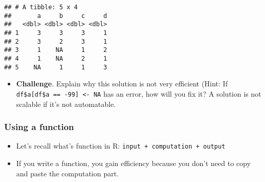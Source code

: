 \documentclass[
]{book}
\newenvironment{Shaded}{\begin{snugshade}}{\end{snugshade}}
\newcommand{\CommentTok}[1]{\textcolor[rgb]{0.56,0.35,0.01}{\textit{#1}}}
\newcommand{\ConstantTok}[1]{\textcolor[rgb]{0.00,0.00,0.00}{#1}}
\newcommand{\DecValTok}[1]{\textcolor[rgb]{0.00,0.00,0.81}{#1}}
\newcommand{\NormalTok}[1]{#1}
\newcommand{\OtherTok}[1]{\textcolor[rgb]{0.56,0.35,0.01}{#1}}
\newcommand{\SpecialCharTok}[1]{\textcolor[rgb]{0.00,0.00,0.00}{#1}}
\providecommand{\tightlist}{%
  \setlength{\itemsep}{0pt}\setlength{\parskip}{0pt}}
\begin{document}
\begin{Shaded}
\end{Shaded}

\begin{verbatim}
## # A tibble: 5 x 4
##       a     b     c     d
##   <dbl> <dbl> <dbl> <dbl>
## 1     3     3     3     1
## 2     3     2     3     1
## 3     1    NA     1     2
## 4     1    NA     2     1
## 5    NA     1     1     3
\end{verbatim}

\begin{itemize}
\tightlist
\item
  \textbf{Challenge}. Explain why this solution is not very efficient (Hint: If \texttt{df\$a{[}df\$a\ ==\ -99{]}\ \textless{}-\ NA} has an error, how will you fix it? A solution is not scalable if it's not automatable.
\end{itemize}

\hypertarget{using-a-function}{%
\subsubsection{Using a function}\label{using-a-function}}

\begin{itemize}
\item
  Let's recall what's function in R: \texttt{input\ +\ computation\ +\ output}
\item
  If you write a function, you gain efficiency because you don't need to copy and paste the computation part.
\end{itemize}
\end{document}
